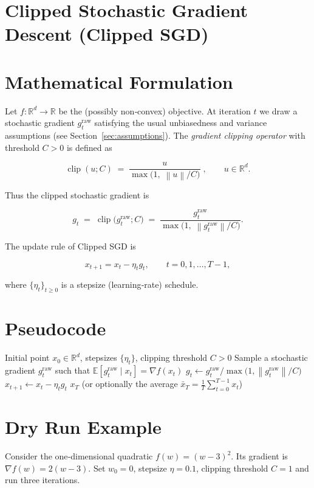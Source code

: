 \documentclass{article}
\newcommand{\E}{\mathbb{E}}
\newcommand{\R}{\mathbb{R}}
\newcommand{\norm}[1]{\left\lVert #1\right\rVert}
\begin{document}
\section*{Clipped Stochastic Gradient Descent (Clipped SGD)}

\section*{Mathematical Formulation}
Let $f:\R^{d}\rightarrow\R$ be the (possibly non‑convex) objective.  
At iteration $t$ we draw a stochastic gradient $g_t^{\text{raw}}$ satisfying the usual unbiasedness and variance assumptions (see Section~\ref{sec:assumptions}).  
The \emph{gradient clipping operator} with threshold $C>0$ is defined as  

\[
\operatorname{clip}(u;C)\;=\;
\frac{u}{\max\!\bigl(1,\;\norm{u}/C\bigr)}\;,
\qquad u\in\R^{d}.
\tag{1}
\]

Thus the clipped stochastic gradient is  

\[
g_t \;=\;\operatorname{clip}\bigl(g_t^{\text{raw}};C\bigr)
      \;=\;\frac{g_t^{\text{raw}}}{\max\!\bigl(1,\;\norm{g_t^{\text{raw}}}/C\bigr)} .
\tag{2}
\]

The update rule of Clipped SGD is  

\[
x_{t+1}=x_t-\eta_t g_t ,\qquad t=0,1,\dots ,T-1,
\tag{3}
\]

where $\{\eta_t\}_{t\ge 0}$ is a stepsize (learning‑rate) schedule.

\section*{Pseudocode}
\begin{algorithm}[H]
\caption{Clipped SGD}
\label{alg:clippedsgd}
\begin{algorithmic}[1]
\Require Initial point $x_0\in\R^{d}$, stepsizes $\{\eta_t\}$, clipping threshold $C>0$
    \State Sample a stochastic gradient $g_t^{\text{raw}}$ such that 
          $\E[g_t^{\text{raw}}\mid x_t]=\nabla f(x_t)$
    \State $g_t\gets g_t^{\text{raw}}/
          \max\bigl(1,\norm{g_t^{\text{raw}}}/C\bigr)$   
    \State $x_{t+1}\gets x_t-\eta_t g_t$
\EndFor
\State \Return $x_T$ (or optionally the average $\bar x_T=\frac1T\sum_{t=0}^{T-1}x_t$)
\end{algorithmic}
\end{algorithm}

\section*{Dry Run Example}
Consider the one‑dimensional quadratic $f(w)=(w-3)^2$.  
Its gradient is $\nabla f(w)=2(w-3)$.  
Set $w_0=0$, stepsize $\eta=0.1$, clipping threshold $C=1$ and run three iterations.
\end{document}
